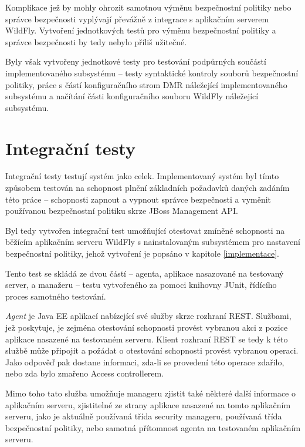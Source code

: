 Komplikace jež by mohly ohrozit samotnou výměnu bezpečnostní politiky nebo správce bezpečnosti vyplývají převážně z integrace s aplikačním serverem WildFly. Vytvoření jednotkových testů pro výměnu bezpečnostní politiky a správce bezpečnosti by tedy nebylo příliš užitečné.

Byly však vytvořeny jednotkové testy pro testování podpůrných součástí implementovaného subsystému -- testy syntaktické kontroly souborů bezpečnostní politiky, práce s částí konfiguračního strom DMR náležející implementovaného subsystému a načítání části konfiguračního souboru WildFly náležející subsystému.

\section{Integrační testy}

Integrační testy testují systém jako celek. Implementovaný systém byl tímto způsobem testován na schopnost plnění základních požadavků daných zadáním této práce -- schopnosti zapnout a vypnout správce bezpečnosti a vyměnit používanou bezpečnostní politiku skrze JBoss Management API.

Byl tedy vytvořen integrační test umožňující otestovat zmíněné schopnosti na běžícím aplikačním serveru WildFly s nainstalovaným subsystémem pro nastavení bezpečnostní politiky, jehož vytvoření je popsáno v kapitole \ref{implementace}.

Tento test se skládá ze dvou částí -- agenta, aplikace nasazované na testovaný server, a manažeru -- testu vytvořeného za pomoci knihovny JUnit, řídícího proces samotného testování.

{\it Agent} je Java EE aplikací nabízející své služby skrze rozhraní REST. Službami, jež poskytuje, je zejména otestování schopnosti provést vybranou akci z pozice aplikace nasazené na testovaném serveru. Klient rozhraní REST se tedy k této službě může připojit a požádat o otestování schopnosti provést vybranou operaci. Jako odpověď pak dostane informaci, zda-li se provedení této operace zdařilo, nebo zda bylo zmařeno Access controllerem.

Mimo toho tato služba umožňuje manageru zjistit také některé další informace o aplikačním serveru, zjistitelné ze strany aplikace nasazené na tomto aplikačním serveru, jako je aktuálně používaná třída security manageru, používaná třída bezpečnostní politiky, nebo samotná přítomnost agenta na testovaném aplikačním serveru.


